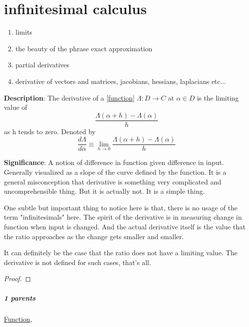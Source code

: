 \documentclass[./main.tex]{subfiles}
\begin{document}
\chapter{infinitesimal calculus}
\todo
\begin{enumerate}[nolistsep]
  \item limits
  \item the beauty of the phrase exact approximation
  \item partial derivatives
  \item derivative of vectors and matrices, jacobians, hessians, laplacians etc...
\end{enumerate}


\begin{statement}
\label{statement:Derivative}\hspace*{0pt}\par
\end{statement}
\textbf{Description}:
The derivative of a [\hyperref[statement:Function]{function}] $\Lambda : D \to C $ at $\alpha \in D$ is the limiting value of
\[
  \frac{\Lambda(\alpha + h) - \Lambda(\alpha)}{h}
\]
as h tends to zero.
Denoted by
\[
  \frac{d\Lambda}{d\alpha} \equiv \lim_{h \to 0}\frac{\Lambda(\alpha + h) - \Lambda(\alpha)}{h}
\]
\par
{\color{magenta} \textbf{Significance}:
A notion of difference in function given difference in input.
Generally visualized as a slope of the curve defined by the function.
It is a general misconception that derivative is something very complicated and uncomprehensible thing.
But it is actually not.
It is a simple thing.

One subtle but important thing to notice here is that, there is no usage of the term "infinitesimals" here.
The spirit of the derivative is in measuring change in function when input is changed.
And the actual derivative itself is the value that the ratio approaches as the change gets smaller and smaller.

It can definitely be the case that the ratio does not have a limiting value.
The derivative is not defined for such cases, that's all.
\par}
\begin{proof}
\proofbydefinition
\end{proof}\par
\paragraph{1 parents} \hyperref[statement:Function]{Function}, 
\end{document}
